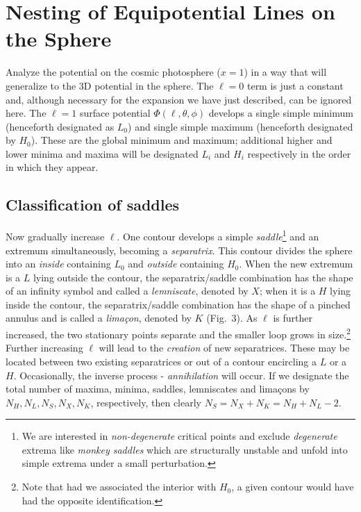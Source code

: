 \documentclass[12pt]{article}
\begin{document}
\section{Nesting of Equipotential Lines on the Sphere}
Analyze the potential on the cosmic photosphere ($x=1$) in a way that will generalize to the 3D potential in the sphere. The $\ell=0$ term is just a constant and, although necessary for the expansion we have just described, can be ignored here.  The $\ell=1$ surface potential $\Phi(\ell,\theta,\phi)$ develops a single simple minimum (henceforth designated as $L_0$) and single simple maximum (henceforth designated by $H_0$). These are the global  minimum and maximum; additional higher and lower minima and maxima will be designated $L_i$ and $H_i$ respectively in the order in which they appear.
\subsection{Classification of saddles}
Now gradually increase $\ell$. One contour develops a simple \emph{saddle}\footnote{We are interested in \emph{non-degenerate} critical points and exclude \emph{degenerate} extrema like \emph{monkey saddles} which are structurally unstable and unfold into simple extrema under a small perturbation.} and an extremum simultaneously, becoming a \emph{separatrix}. This contour divides the sphere into an \emph{inside} containing $L_0$ and \emph{outside} containing $H_0$. When the new extremum is a $L$ lying outside the contour, the separatrix/saddle combination has the shape of an infinity symbol and called a \emph{lemniscate}, denoted by $X$; when it is a $H$ lying inside the contour, the separatrix/saddle combination has the shape of a pinched annulus and is called a \emph{lima\c con}, denoted by $K$ (Fig.~3). As $\ell$ is further increased, the two stationary points separate and the smaller loop grows in size.\footnote{Note that had we associated the interior with $H_0$, a given contour would have had the opposite identification.} Further increasing $\ell$ will lead to the \emph{creation} of new separatrices. These may be located between two existing separatrices or out of a contour encircling a $L$ or a $H$.  Occasionally, the inverse process - \emph{annihilation} will occur. If we designate the total  number of maxima, minima, saddles, lemniscates and lima\c cons by $N_H,N_L,N_S,N_X,N_K$, respectively, then clearly $N_S=N_X+N_K=N_H+N_L-2$.
\end{document}
